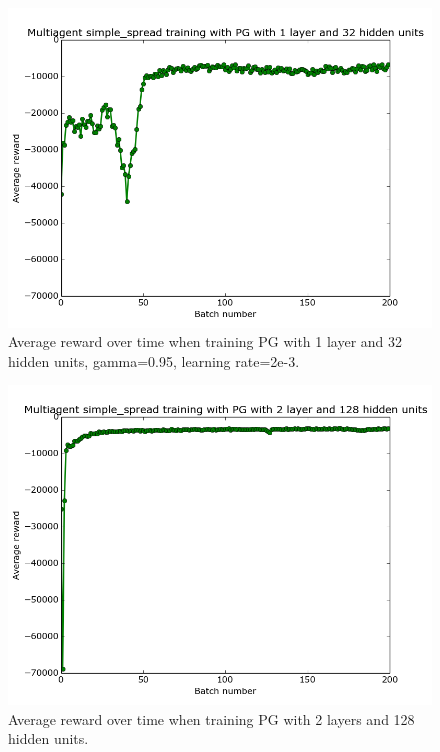 \documentclass{article}
\begin{document}
\begin{figure}
\centering
    \includegraphics[scale=0.25]{pg_1_32_gamma95}
    \caption{Average reward over time when training PG with 1 layer and 32 hidden units, gamma=0.95, learning rate=2e-3.}
\label{fig:pg_1_32_gamma95}
\end{figure}

\begin{figure}
\centering
    \includegraphics[scale=0.25]{pg_2_128_gamma1}
    \caption{Average reward over time when training PG with 2 layers and 128 hidden units.}
\label{fig:pg_2_128_gamma1}
\end{figure}
\end{document}
